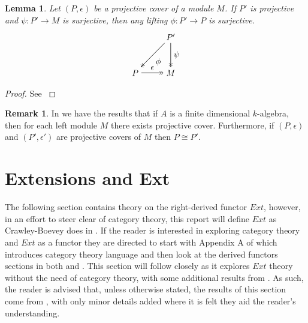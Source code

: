 \documentclass[11.5pt, twoside, a4paper, titlepage]{report}
\theoremstyle{definition}
\newtheorem{rem}[mydef]{Remark}
\theoremstyle{plain}
\newtheorem{lem}[mydef]{Lemma}
\begin{document}
\begin{lem}
Let $(P,\epsilon)$ be a projective cover of a module $M$. If $P'$ is projective and $\psi: P' \to M$ is surjective, then any lifting $\phi: P' \to P$ is surjective.
\begin{equation*}
\begin{tikzpicture}[->,-latex, auto, main path/.style={->>, semithick}, main node/.style={}]
\node	[main node]		(2) at (0,0)			{$P$};
\node	[main node]		(3) at (1.5,0)		{$M$};
\node [main node]		(4) at (1.5,1.5)		{$P'$};

\draw (2) edge [main path] node [auto] {$\epsilon$} (3);
\draw (4) edge [main path] node [auto] {$\psi$} (3);
\draw (4) edge [main path] node [auto] {$\phi$} (2);
\end{tikzpicture}
\end{equation*}
\end{lem}
\begin{proof}
See \cite{Rotman}
\end{proof}

\begin{rem}
In \cite{Vale} we have the results that if $A$ is a finite dimensional $k$-algebra, then for each left module $M$ there exists projective cover. Furthermore, if $(P, \epsilon)$ and $(P', \epsilon')$ are projective covers of $M$ then $P\cong P'$.
\end{rem}


\section{Extensions and Ext}

The following section contains theory on the right-derived functor $Ext$, however, in an effort to steer clear of category theory, this report will define $Ext$ as Crawley-Boevey does in \cite{CB1}. If the reader is interested in exploring category theory and $Ext$ as a functor they are directed to start with Appendix A of \cite{Weibel} which introduces category theory language and then look at the derived functors sections in both \cite{Weibel} and \cite{Rotman}. This section will follow \cite{CB1} closely as it explores $Ext$ theory without the need of category theory, with some  additional results from \cite{Weibel}. As such, the reader is advised that, unless otherwise stated, the results of this section come from \cite{CB1}, with only minor details added where it is felt they aid the reader's understanding.
\end{document}
